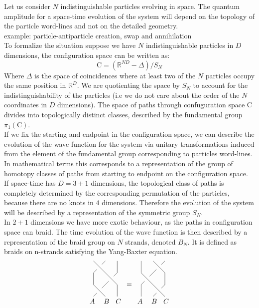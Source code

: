 \documentclass{article}
\begin{document}
Let us consider $N$ indistinguishable particles evolving in space. The quantum amplitude for a space-time evolution of the system will depend on the topology of the particle word-lines and not on the detailed geometry. \\
example: particle-antiparticle creation, swap and annihilation\\
To formalize the situation suppose we have $N$ indistinguishable particles in $D$ dimensions, the configuration space can be written as:
$$ \mathrm{C}=(\mathbb{R}^{ND}-\Delta)/S_N$$
Where $\Delta$ is the space of coincidences where at least two of the $N$ particles occupy the same position in $\mathbb{R}^D$. We are quotienting the space by $S_N$ to account for the indistinguishability of the particles (i.e we do not care about the order of the $N$ coordinates in $D$ dimensions). The space of paths through confuguration space $\mathrm{C}$ divides into topologically distinct classes, described by the fundamental group $\pi_1(\mathrm{C})$.\\
If we fix the starting and endpoint in the configuration space, we can describe the evolution of the wave function for the system  via unitary transformations induced from the element of the fundamental group corresponding to particles word-lines. In mathematical terms this corresponds to a representation of the group of homotopy classes of paths from starting to endpoint on the configuration space. \\
If space-time has $D=3+1$ dimensions,  the topological class of paths is completely determined by the corresponding permutation of the particles, because there are no knots in $4$ dimensions. Therefore the evolution of the system will be described by a representation of the symmetric group $S_N$. \\
In $2+1$ dimensions we have more exotic behaviour, as the paths in configuration space can braid. The time evolution of the wave function is then described by a representation of the braid group on $N$ strands, denoted $B_N$.
It is defined as braids on n-strands satisfying the Yang-Baxter equation.
\begin{equation}
\begin{gathered}
\begin{tikzpicture}[scale=0.6]
\node (0) at (0.5,0.5) {};
\node (1) at (-0.1,-0.4) {$A$};
\node (2) at (1.1,-0.4) {$B$};
\node (3) at (2.1,-0.4) {$C$};
\node (4) at (1.5,1.5) {};
\node (5) at (0.5,2.5) {};
\draw (0,0)--(0)--(1,1)--(4)--(2,2)--(2,3);
\draw (1,0)--(0,1)--(0,2)--(5)--(1,3);
\draw (2,0)--(2,1)--(0,3);
\end{tikzpicture}
\end{gathered}
\, = \,
\begin{gathered}
\begin{tikzpicture}[scale=0.6]
\node (0) at (1.5,0.5) {};
\node (1) at (-0.1,-0.4) {$A$};
\node (2) at (1.1,-0.4) {$B$};
\node (3) at (2.1,-0.4) {$C$};
\node (4) at (0.5,1.5) {};
\node (5) at (1.5,2.5) {};
\draw (2,0)--(1,1)--(0,2)--(0,3);
\draw (1,0)--(0)--(2,1)--(2,2)--(1,3);
\draw (0,0)--(0,1)--(4)--(5)--(2,3);
\end{tikzpicture}
\end{gathered}
\end{equation}
\end{document}
